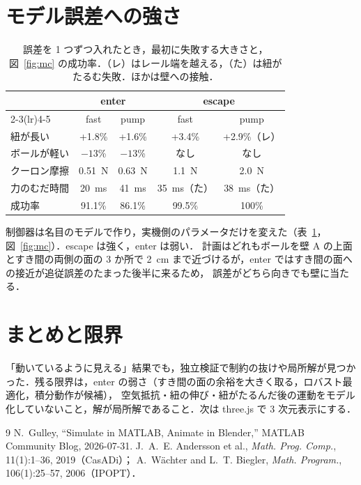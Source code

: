 \documentclass[a4paper,twocolumn,10pt]{ltjsarticle}
\newcommand{\figref}[1]{図~\ref{#1}}
\newcommand{\tabref}[1]{表~\ref{#1}}
\begin{document}
\section{モデル誤差への強さ}
\begin{table}[t]
  \centering
  \caption{誤差を 1 つずつ入れたとき，最初に失敗する大きさと，\figref{fig:mc} の成功率．（レ）はレール端を越える，（た）は紐がたるむ失敗．ほかは壁への接触．}
  \label{tab:robust}
  \small
  \setlength{\tabcolsep}{2.4pt}
  \begin{tabular}{lcccc}
    \toprule
    & \multicolumn{2}{c}{enter} & \multicolumn{2}{c}{escape} \\
    \cmidrule(lr){2-3}\cmidrule(lr){4-5}
    & fast & pump & fast & pump \\
    \midrule
    紐が長い & +1.8\% & +1.6\% & +3.4\% & +2.9\%（レ） \\
    ボールが軽い & $-13$\% & $-13$\% & なし & なし \\
    クーロン摩擦 & \SI{0.51}{N} & \SI{0.63}{N} & \SI{1.1}{N} & \SI{2.0}{N} \\
    力のむだ時間 & \SI{20}{ms} & \SI{41}{ms} & \SI{35}{ms}（た） & \SI{38}{ms}（た） \\
    \midrule
    成功率 & 91.1\% & 86.1\% & 99.5\% & 100\% \\
    \bottomrule
  \end{tabular}
\end{table}
制御器は名目のモデルで作り，実機側のパラメータだけを変えた（\tabref{tab:robust}，\figref{fig:mc}）．escape は強く，enter は弱い．
計画はどれもボールを壁 A の上面とすき間の両側の面の 3 か所で \SI{2}{cm} まで近づけるが，enter ではすき間の面への接近が追従誤差のたまった後半に来るため，
誤差がどちら向きでも壁に当たる．

\section{まとめと限界}
「動いているように見える」結果でも，独立検証で制約の抜けや局所解が見つかった．残る限界は，enter の弱さ（すき間の面の余裕を大きく取る，ロバスト最適化，積分動作が候補），
空気抵抗・紐の伸び・紐がたるんだ後の運動をモデル化していないこと，解が局所解であること．次は three.js で 3 次元表示にする．

{\footnotesize
\begin{thebibliography}{9}
  \setlength{\itemsep}{0pt}
   N.~Gulley, ``Simulate in MATLAB, Animate in Blender,'' MATLAB Community Blog, 2026-07-31.
   J.~A.~E. Andersson et al., \emph{Math. Prog. Comp.}, 11(1):1--36, 2019（CasADi）；
    A.~W\"achter and L.~T. Biegler, \emph{Math. Program.}, 106(1):25--57, 2006（IPOPT）．
\end{thebibliography}}
\end{document}

